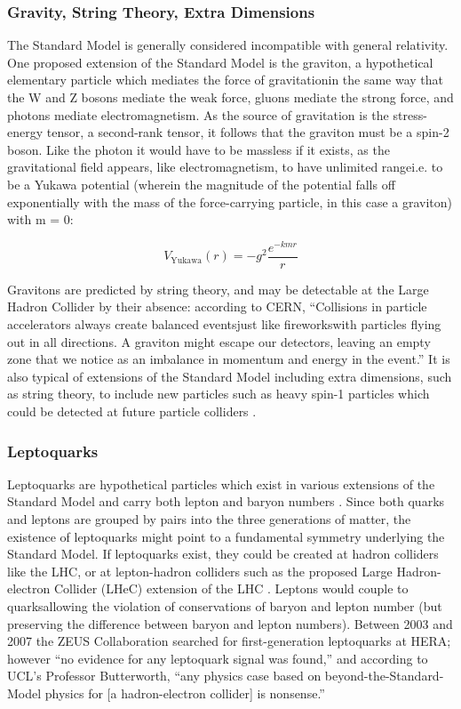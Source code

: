 \subsubsection{Gravity, String Theory, Extra Dimensions}
The Standard Model is generally considered incompatible with general relativity. One proposed extension of the Standard Model is the graviton, a hypothetical elementary particle which mediates the force of gravitation\textemdash in the same way that the W and Z bosons mediate the weak force, gluons mediate the strong force, and photons mediate electromagnetism. As the source of gravitation is the stress-energy tensor, a second-rank tensor, it follows that the graviton must be a spin-2 boson. Like the photon it would have to be massless if it exists, as the gravitational field appears, like electromagnetism, to have unlimited range\textemdash i.e. to be a Yukawa potential (wherein the magnitude of the potential falls off exponentially with the mass of the force-carrying particle, in this case a graviton) with m = 0:

\begin{equation*}
V_\text{Yukawa}(r)= -g^2\frac{e^{-kmr}}{r}
\end{equation*}

Gravitons are predicted by string theory, and may be detectable at the Large Hadron Collider by their absence: according to CERN, ``Collisions in particle accelerators always create balanced events\textemdash just like fireworks\textemdash with particles flying out in all directions. A graviton might escape our detectors, leaving an empty zone that we notice as an imbalance in momentum and energy in the event.'' \cite{CERN:Gravitons:Online,deAquino:Gravitons} It is also typical of extensions of the Standard Model including extra dimensions, such as string theory, to include new particles such as heavy spin-1 particles which could be detected at future particle colliders \cite{CLIC:Concept}.

\subsubsection{Leptoquarks}
Leptoquarks are hypothetical particles which exist in various extensions of the Standard Model and carry both lepton and baryon numbers \cite{PDG:Leptoquark}. Since both quarks and leptons are grouped by pairs into the three generations of matter, the existence of leptoquarks might point to a fundamental symmetry underlying the Standard Model. If leptoquarks exist, they could be created at hadron colliders like the LHC, or at lepton-hadron colliders such as the proposed Large Hadron-electron Collider (LHeC) extension of the LHC \cite{Waters:Interview}. Leptons would couple to quarks\textemdash allowing the violation of conservations of baryon and lepton number (but preserving the difference between baryon and lepton numbers). Between 2003 and 2007 the ZEUS Collaboration searched for first-generation leptoquarks at HERA; however ``no evidence for any leptoquark signal was found,'' \cite{ZEUS:Leptoquark} and according to UCL's Professor Butterworth, ``any physics case based on beyond-the-Standard-Model physics for [a hadron-electron collider] is nonsense.'' \cite{Butterworth:Interview}
